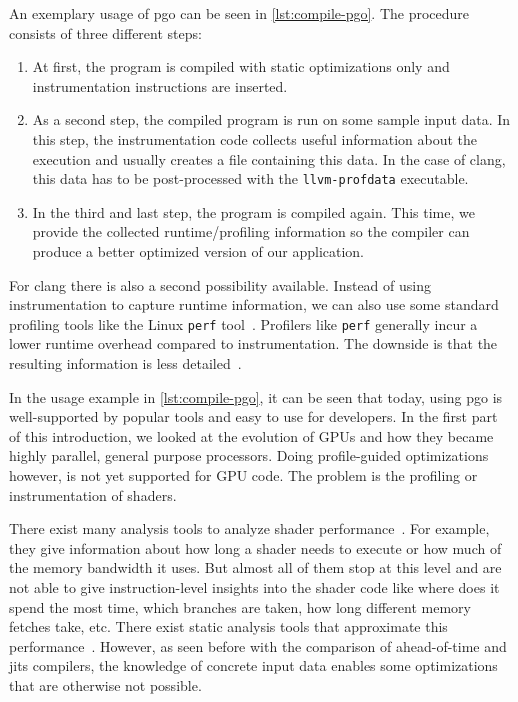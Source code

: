 

An exemplary usage of \gls{pgo} can be seen in \cref{lst:compile-pgo}. The procedure consists of three different steps:
\begin{enumerate}
	\item At first, the program is compiled with static optimizations only and instrumentation instructions are inserted.
	\item As a second step, the compiled program is run on some sample input data. In this step, the instrumentation code collects useful information about the execution and usually creates a file containing this data. In the case of clang, this data has to be post-processed with the \texttt{llvm-profdata} executable.
	\item In the third and last step, the program is compiled again. This time, we provide the collected runtime/profiling information so the compiler can produce a better optimized version of our application.
\end{enumerate}

For clang there is also a second possibility available. Instead of using instrumentation to capture runtime information, we can also use some standard profiling tools like the Linux \texttt{perf} tool~\cite{LinuxPerf}. Profilers like \texttt{perf} generally incur a lower runtime overhead compared to instrumentation. The downside is that the resulting information is less detailed~\cite{ClangManual}.

In the usage example in \cref{lst:compile-pgo}, it can be seen that today, using \gls{pgo} is well-supported by popular tools and easy to use for developers. In the first part of this introduction, we looked at the evolution of GPUs and how they became highly parallel, general purpose processors. Doing profile-guided optimizations however, is not yet supported for GPU code. The problem is the profiling or instrumentation of shaders.

There exist many analysis tools to analyze shader performance~\cite{RenderDoc, NvidiaShaderPerf}. For example, they give information about how long a shader needs to execute or how much of the memory bandwidth it uses. But almost all of them stop at this level and are not able to give instruction-level insights into the shader code like where does it spend the most time, which branches are taken, how long different memory fetches take, etc. There exist static analysis tools that approximate this performance~\cite{AMDShaderAnalyzer}. However, as seen before with the comparison of ahead-of-time and \glspl{jit} compilers, the knowledge of concrete input data enables some optimizations that are otherwise not possible.

